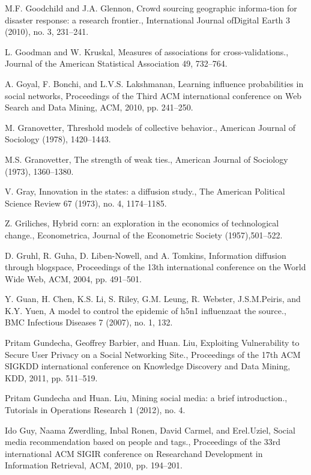 \begin{thebibliography}{999}
 M.F. Goodchild and J.A. Glennon, Crowd sourcing geographic informa-tion for disaster response: a research frontier., International Journal ofDigital Earth 3 (2010), no. 3, 231–241.

 L. Goodman and W. Kruskal, Measures of associations for cross-validations., Journal of the American Statistical Association 49, 732–764.

 A. Goyal, F. Bonchi, and L.V.S. Lakshmanan, Learning influence probabilities in social networks, Proceedings of the Third ACM international conference on Web Search and Data Mining, ACM, 2010, pp. 241–250.

 M. Granovetter, Threshold models of collective behavior., American Journal of Sociology (1978), 1420–1443.

 M.S. Granovetter, The strength of weak ties., American Journal of Sociology (1973), 1360–1380.

 V. Gray, Innovation in the states: a diffusion study., The American Political Science Review 67 (1973), no. 4, 1174–1185.

 Z. Griliches, Hybrid corn: an exploration in the economics of technological change., Econometrica, Journal of the Econometric Society (1957),501–522.

 D. Gruhl, R. Guha, D. Liben-Nowell, and A. Tomkins, Information diffusion through blogspace, Proceedings of the 13th international conference on the World Wide Web, ACM, 2004, pp. 491–501.

 Y. Guan, H. Chen, K.S. Li, S. Riley, G.M. Leung, R. Webster, J.S.M.Peiris, and K.Y. Yuen, A model to control the epidemic of h5n1 influenzaat the source., BMC Infectious Diseases 7 (2007), no. 1, 132.

 Pritam Gundecha, Geoffrey Barbier, and Huan. Liu, Exploiting Vulnerability to Secure User Privacy on a Social Networking Site., Proceedings of the 17th ACM SIGKDD international conference on Knowledge Discovery and Data Mining, KDD, 2011, pp. 511–519.

 Pritam Gundecha and Huan. Liu, Mining social media: a brief introduction., Tutorials in Operations Research 1 (2012), no. 4.

 Ido Guy, Naama Zwerdling, Inbal Ronen, David Carmel, and Erel.Uziel, Social media recommendation based on people and tags., Proceedings of the 33rd international ACM SIGIR conference on Researchand Development in Information Retrieval, ACM, 2010, pp. 194–201.


\end{thebibliography}
